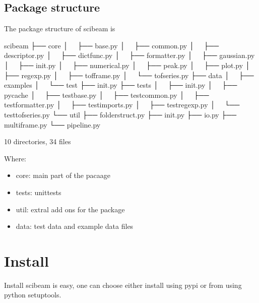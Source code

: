 \documentclass[letterpaper,10pt,english]{sphinxmanual}
\begin{document}
\section{Package structure}
\label{\detokenize{about:package-structure}}
The package structure of scibeam is

%
\begin{sphinxVerbatim}[commandchars=\\\{\}]
scibeam
├── core
│   ├── base.py
│   ├── common.py
│   ├── descriptor.py
│   ├── dictfunc.py
│   ├── formatter.py
│   ├── gaussian.py
│   ├── \PYGZus{}\PYGZus{}init\PYGZus{}\PYGZus{}.py
│   ├── numerical.py
│   ├── peak.py
│   ├── plot.py
│   ├── regexp.py
│   ├── tofframe.py
│   └── tofseries.py
├── data
│   ├── examples
│   └── test
├── \PYGZus{}\PYGZus{}init\PYGZus{}\PYGZus{}.py
├── tests
│   ├── \PYGZus{}\PYGZus{}init\PYGZus{}\PYGZus{}.py
│   ├── \PYGZus{}\PYGZus{}pycache\PYGZus{}\PYGZus{}
│   ├── test\PYGZus{}base.py
│   ├── test\PYGZus{}common.py
│   ├── test\PYGZus{}formatter.py
│   ├── test\PYGZus{}imports.py
│   ├── test\PYGZus{}regexp.py
│   └── test\PYGZus{}tofseries.py
└── util
    ├── folderstruct.py
    ├── \PYGZus{}\PYGZus{}init\PYGZus{}\PYGZus{}.py
    ├── io.py
    ├── multiframe.py
    └── pipeline.py
\end{sphinxVerbatim}

10 directories, 34 files

Where:
\begin{itemize}
\item {} 
core: main part of the pacaage

\item {} 
tests: unittests

\item {} 
util: extral add ons for the package

\item {} 
data: test data and example data files

\end{itemize}


\chapter{Install}
\label{\detokenize{install:install}}\label{\detokenize{install::doc}}
Install scibeam is easy, one can choose either install using pypi or from  using python setuptools.
\end{document}
